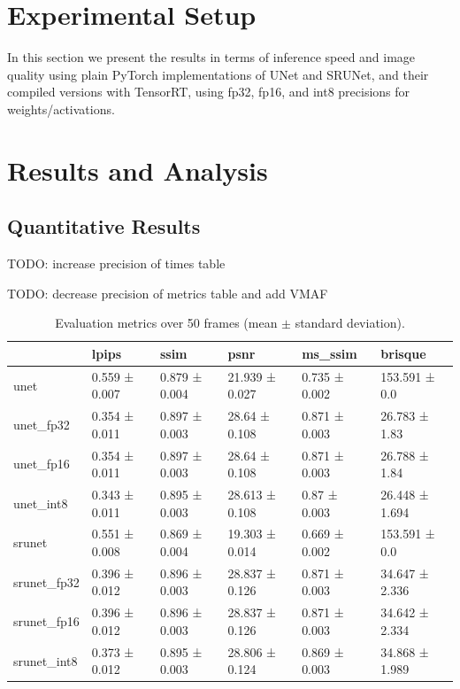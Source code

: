 \label{chap:Experiments}

\section{Experimental Setup}
In this section we present the results in terms of inference speed and image quality using plain PyTorch implementations of UNet and SRUNet, and their compiled versions with TensorRT, using fp32, fp16, and int8 precisions for weights/activations.

\section{Results and Analysis}

\subsection{Quantitative Results}

TODO: increase precision of times table

TODO: decrease precision of metrics table and add VMAF

\begin{table}[t]
\begin{tabular}{llllll}
\toprule
{} &          lpips &           ssim &            psnr &        ms\_ssim &         brisque \\
\midrule
unet        &  0.559 ± 0.007 &  0.879 ± 0.004 &  21.939 ± 0.027 &  0.735 ± 0.002 &   153.591 ± 0.0 \\
unet\_fp32   &  0.354 ± 0.011 &  0.897 ± 0.003 &   28.64 ± 0.108 &  0.871 ± 0.003 &   26.783 ± 1.83 \\
unet\_fp16   &  0.354 ± 0.011 &  0.897 ± 0.003 &   28.64 ± 0.108 &  0.871 ± 0.003 &   26.788 ± 1.84 \\
unet\_int8   &  0.343 ± 0.011 &  0.895 ± 0.003 &  28.613 ± 0.108 &   0.87 ± 0.003 &  26.448 ± 1.694 \\
srunet      &  0.551 ± 0.008 &  0.869 ± 0.004 &  19.303 ± 0.014 &  0.669 ± 0.002 &   153.591 ± 0.0 \\
srunet\_fp32 &  0.396 ± 0.012 &  0.896 ± 0.003 &  28.837 ± 0.126 &  0.871 ± 0.003 &  34.647 ± 2.336 \\
srunet\_fp16 &  0.396 ± 0.012 &  0.896 ± 0.003 &  28.837 ± 0.126 &  0.871 ± 0.003 &  34.642 ± 2.334 \\
srunet\_int8 &  0.373 ± 0.012 &  0.895 ± 0.003 &  28.806 ± 0.124 &  0.869 ± 0.003 &  34.868 ± 1.989 \\
\bottomrule
\end{tabular}
\caption{Evaluation metrics over 50 frames (mean $\pm$ standard deviation).}
\label{tab:tab1}
\end{table}

